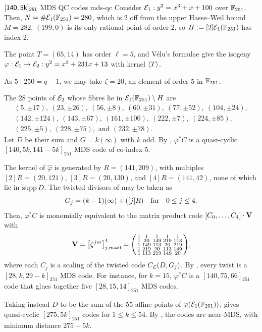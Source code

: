 \documentclass[twocolumn, 11pt]{scrartcl}
\begin{document}
\begin{example}{$\sf{[140,5k]_{251}}$ MDS\hspace{-1pt} QC\hspace{-1pt} codes \cite{our-github}}{mds-qc} \setlength{\parskip}{5pt}
Consider $\mcE_1:y^2=x^3+x+100$ over $\bbF_{251}$. Then, $N=\#\mcE_1(\bbF_{251})=280$, which is 2 off from the upper Hasse--Weil bound $M=282$. $(199,0)$ is its only rational point of order 2, so $H:=[2]\mcE_1(\bbF_{251})$ has index 2.

The point $T=(65,14)$ has order $\ell=5$, and V\'elu's formulae give the isogeny $\varphi:\mcE_1\to\mcE_2:y^2=x^3+231x+13$ with kernel $\ang T$.

As $5\mid250=q-1$, we may take $\zeta=20$, an element of order 5 in $\bbF_{251}$.

The 28 points of $\mcE_2$ whose fibres lie in $\mcE_1(\bbF_{251})\setminus H$ are
\[ \begin{gathered}
\scriptstyle (5,\pm17),\ (23,\pm26),\ (56,\pm8),\ (60,\pm31),\ (77,\pm52),\ (104,\pm24),\\[-6pt]
\scriptstyle (142,\pm124),\ (143,\pm67),\ (161,\pm100),\ (222,\pm7),\ (224,\pm85),\\[-6pt]
\scriptstyle (225,\pm5),\ (228,\pm75),\text{ and } (232,\pm78).
\end{gathered} \]
Let $D$ be their sum and $G=k(\infty)$ with $k$ odd. By , $\varphi^*C$ is a quasi-cyclic $[140,5k,141-5k]_{251}$ MDS code of co-index 5.

The kernel of $\hat\varphi$ is generated by $R=(141,209)$, with multiples
$[2]R=(20,121)$, $[3]R=(20,130)$, and $[4]R=(141,42)$,
none of which lie in $\supp D$. The twisted divisors of  may be taken as
\[ G_j=(k-1)(\infty)+([j]R) \qfor 0\leq j\leq4. \]
Then, $\varphi^*C$ is monomially equivalent to the matrix product code $[C_0,\hdots,C_4]\cdot\bfV$ with
\[ \bfV=\br*{\zeta^{jm}}_{j,m=0}^4=\begin{psmallmatrix}
1&1&1&1&1 \\
1&20&149&219&113 \\
1&149&113&20&219 \\
1&219&20&113&149 \\
1&113&219&149&20
\end{psmallmatrix}, \]
where each $C_j$ is a scaling of the twisted code $C_\mcL(D,G_j)$. By , every twist is a $[28,k,29-k]_{251}$ MDS code. For instance, for $k=15$, $\varphi^*C$ is a $[140,75,66]_{251}$ code that glues together five $[28,15,14]_{251}$ MDS codes.

Taking instead $D$ to be the sum of the 55 affine points of $\varphi(\mcE_1(\bbF_{251}))$,  gives quasi-cyclic $[275,5k]_{251}$ codes for $1\leq k\leq54$. By , the codes are near-MDS, with minimum distance $275-5k$.
\end{example}
\end{document}
